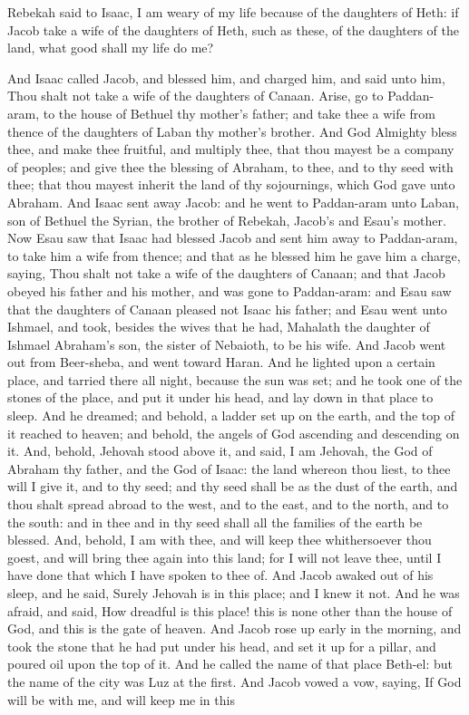 Rebekah said to Isaac, I am weary of my life because of the daughters of Heth: if Jacob take a wife of the daughters of Heth, such as these, of the daughters of the land, what good shall my life do me? 

And Isaac called Jacob, and blessed him, and charged him, and said unto him, Thou shalt not take a wife of the daughters of Canaan. Arise, go to Paddan-aram, to the house of Bethuel thy mother’s father; and take thee a wife from thence of the daughters of Laban thy mother’s brother. And God Almighty bless thee, and make thee fruitful, and multiply thee, that thou mayest be a company of peoples; and give thee the blessing of Abraham, to thee, and to thy seed with thee; that thou mayest inherit the land of thy sojournings, which God gave unto Abraham. And Isaac sent away Jacob: and he went to Paddan-aram unto Laban, son of Bethuel the Syrian, the brother of Rebekah, Jacob’s and Esau’s mother.  Now Esau saw that Isaac had blessed Jacob and sent him away to Paddan-aram, to take him a wife from thence; and that as he blessed him he gave him a charge, saying, Thou shalt not take a wife of the daughters of Canaan; and that Jacob obeyed his father and his mother, and was gone to Paddan-aram: and Esau saw that the daughters of Canaan pleased not Isaac his father; and Esau went unto Ishmael, and took, besides the wives that he had, Mahalath the daughter of Ishmael Abraham’s son, the sister of Nebaioth, to be his wife.  And Jacob went out from Beer-sheba, and went toward Haran. And he lighted upon a certain place, and tarried there all night, because the sun was set; and he took one of the stones of the place, and put it under his head, and lay down in that place to sleep. And he dreamed; and behold, a ladder set up on the earth, and the top of it reached to heaven; and behold, the angels of God ascending and descending on it. And, behold, Jehovah stood above it, and said, I am Jehovah, the God of Abraham thy father, and the God of Isaac: the land whereon thou liest, to thee will I give it, and to thy seed; and thy seed shall be as the dust of the earth, and thou shalt spread abroad to the west, and to the east, and to the north, and to the south: and in thee and in thy seed shall all the families of the earth be blessed. And, behold, I am with thee, and will keep thee whithersoever thou goest, and will bring thee again into this land; for I will not leave thee, until I have done that which I have spoken to thee of. And Jacob awaked out of his sleep, and he said, Surely Jehovah is in this place; and I knew it not. And he was afraid, and said, How dreadful is this place! this is none other than the house of God, and this is the gate of heaven.  And Jacob rose up early in the morning, and took the stone that he had put under his head, and set it up for a pillar, and poured oil upon the top of it. And he called the name of that place Beth-el: but the name of the city was Luz at the first. And Jacob vowed a vow, saying, If God will be with me, and will keep me in this 